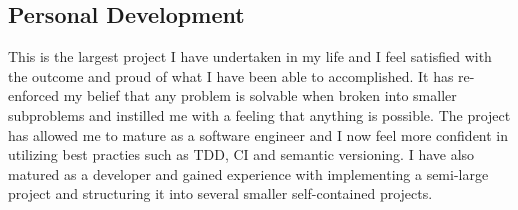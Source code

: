 
\subsection{Personal Development}

This is the largest project I have undertaken in my life and I feel satisfied with the outcome and proud of what I have been able to accomplished. It has re-enforced my belief that any problem is solvable when broken into smaller subproblems and instilled me with a feeling that anything is possible. The project has allowed me to mature as a software engineer and I now feel more confident in utilizing best practies such as TDD, CI and semantic versioning. I have also matured as a developer and gained experience with implementing a semi-large project and structuring it into several smaller self-contained projects.
